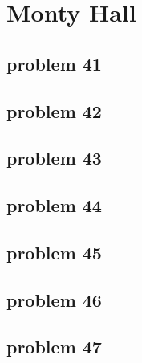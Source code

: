 \section{Monty Hall}

\subsection{problem 41}


\subsection{problem 42}


\subsection{problem 43}


\subsection{problem 44}


\subsection{problem 45}


\subsection{problem 46}


\subsection{problem 47}
